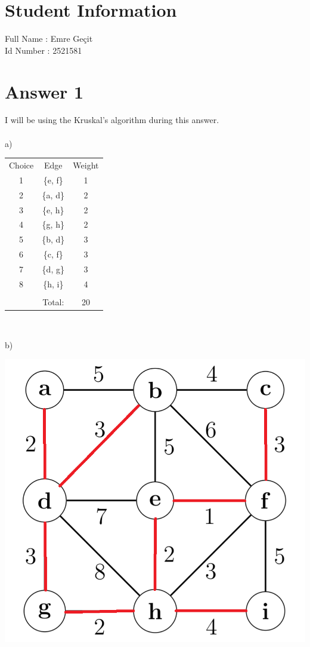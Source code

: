 \documentclass[12pt]{article}
\begin{document}
\section*{Student Information } 
Full Name : Emre Geçit \\
Id Number : 2521581 \\

\section*{Answer 1}
I will be using the Kruskal's algorithm during this answer.\\\\
a)
\begin{center}

\begin{tabular}{ c c c }
 Choice & Edge & Weight \\ 
 1 & \{e, f\} & 1 \\  
 2 & \{a, d\} & 2 \\
 3 & \{e, h\} & 2 \\
 4 & \{g, h\} & 2 \\
 5 & \{b, d\} & 3 \\
 6 & \{c, f\} & 3 \\
 7 & \{d, g\} & 3 \\
 8 & \{h, i\} & 4 \\
   &          &   \\
   & Total:   & 20
\end{tabular}\
\end{center}
b)
\begin{center}
\includegraphics[scale=0.35]{annenspanningtree.png}\\
\end{center}
\end{document}
